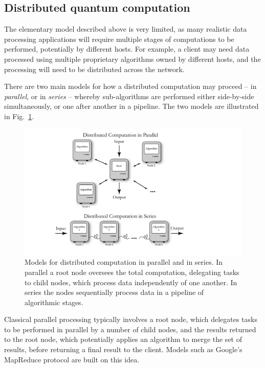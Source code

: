 \documentclass[aps,rmp,twocolumn,amsmath,amssymb,nofootinbib,superscriptaddress,longbibliography,floatfix]{revtex4-1}
\begin{document}
%
%

\subsection{Distributed quantum computation} \label{sec:dist_QC}

The elementary model described above is very limited, as many realistic data processing applications will require multiple stages of computations to be performed, potentially by different hosts. For example, a client may need data processed using multiple proprietary algorithms owned by different hosts, and the processing will need to be distributed across the network.

There are two main models for how a distributed computation may proceed -- in \emph{parallel}, or in \emph{series} -- whereby sub-algorithms are performed either side-by-side simultaneously, or one after another in a pipeline. The two models are illustrated in Fig.~\ref{fig:distributed}.

\begin{figure}[!htb]
\includegraphics[width=\columnwidth]{distributed}
\caption{Models for distributed computation in parallel and in series. In parallel a root node oversees the total computation, delegating tasks to child nodes, which process data independently of one another. In series the nodes sequentially process data in a pipeline of algorithmic stages.} \label{fig:distributed}
\end{figure}

Classical parallel processing typically involves a root node, which delegates tasks to be performed in parallel by a number of child nodes, and the results returned to the root node, which potentially applies an algorithm to merge the set of results, before returning a final result to the client. Models such as Google's {\sc MapReduce} protocol \cite{bib:MapReduce} are built on this idea.
\end{document}
